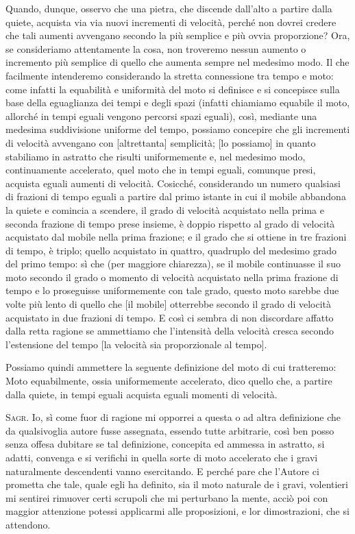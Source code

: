 \documentclass[11pt,twoside,openany]{book}
\newcommand{\speaker}[1]{\textcolor{rubric}{\textsc{#1}}\space}
\begin{document}
Quando, dunque, osservo che una pietra, che discende dall'alto a partire dalla quiete, acquista via via nuovi incrementi di velocità, perché non dovrei credere che tali aumenti avvengano secondo la più semplice e più ovvia proporzione? Ora, se consideriamo attentamente la cosa, non troveremo nessun aumento o incremento più semplice di quello che aumenta sempre nel medesimo modo. Il che facilmente intenderemo considerando la stretta connessione tra tempo e moto: come infatti la equabilità e uniformità del moto si definisce e si concepisce sulla base della eguaglianza dei tempi e degli spazi (infatti chiamiamo equabile il moto, allorché in tempi eguali vengono percorsi spazi eguali), così, mediante una medesima suddivisione uniforme del tempo, possiamo concepire che gli incrementi di velocità avvengano con [altrettanta] semplicità; [lo possiamo] in quanto stabiliamo in astratto che risulti uniformemente e, nel medesimo modo, continuamente accelerato, quel moto che in tempi eguali, comunque presi, acquista eguali aumenti di velocità. Cosicché, considerando un numero qualsiasi di frazioni di tempo eguali a partire dal primo istante in cui il mobile abbandona la quiete e comincia a scendere, il grado di velocità acquistato nella prima e seconda frazione di tempo prese insieme, è doppio rispetto al grado di velocità acquistato dal mobile nella prima frazione; e il grado che si ottiene in tre frazioni di tempo, è triplo; quello acquistato in quattro, quadruplo del medesimo grado del primo tempo: sì che (per maggiore chiarezza), se il mobile continuasse il suo moto secondo il grado o momento di velocità acquistato nella prima frazione di tempo e lo proseguisse uniformemente con tale grado, questo moto sarebbe due volte più lento di quello che [il mobile] otterrebbe secondo il grado di velocità acquistato in due frazioni di tempo. E così ci sembra di non discordare affatto dalla retta ragione se ammettiamo che l'intensità della velocità cresca secondo l'estensione del tempo [la velocità sia proporzionale al tempo].

Possiamo quindi ammettere la seguente definizione del moto di cui tratteremo: Moto equabilmente, ossia uniformemente accelerato, dico quello che, a partire dalla quiete, in tempi eguali acquista eguali momenti di velocità.

\speaker{Sagr.} Io, sì come fuor di ragione mi opporrei a questa o ad altra definizione che da qualsivoglia autore fusse assegnata, essendo tutte arbitrarie, così ben posso senza offesa dubitare se tal definizione, concepita ed ammessa in astratto, si adatti, convenga e si verifichi in quella sorte di moto accelerato che i gravi naturalmente descendenti vanno esercitando. E perché pare che l'Autore ci prometta che tale, quale egli ha definito, sia il moto naturale de i gravi, volentieri mi sentirei rimuover certi scrupoli che mi perturbano la mente, acciò poi con maggior attenzione potessi applicarmi alle proposizioni, e lor dimostrazioni, che si attendono.
\end{document}
